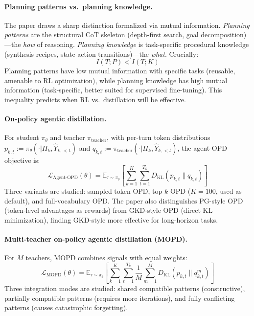 \documentclass[11pt,a4paper]{article}
\begin{document}
\paragraph{Planning patterns vs.\ planning knowledge.}
The paper draws a sharp distinction formalized via mutual information. \emph{Planning patterns} are the structural CoT skeleton (depth-first search, goal decomposition)---the \emph{how} of reasoning. \emph{Planning knowledge} is task-specific procedural knowledge (synthesis recipes, state-action transitions)---the \emph{what}. Crucially:
\begin{equation}
    I(T; P) < I(T; K)
\end{equation}
Planning patterns have low mutual information with specific tasks (reusable, amenable to RL optimization), while planning knowledge has high mutual information (task-specific, better suited for supervised fine-tuning). This inequality predicts when RL vs.\ distillation will be effective.

\paragraph{On-policy agentic distillation.}
For student $\pi_\theta$ and teacher $\pi_{\text{teacher}}$, with per-turn token distributions $p_{k,t} := \pi_\theta(\cdot|H_k, \hat{Y}_{k,<t})$ and $q_{k,t} := \pi_{\text{teacher}}(\cdot|H_k, \hat{Y}_{k,<t})$, the agent-OPD objective is:
\begin{equation}
    \mathcal{L}_{\text{Agent-OPD}}(\theta) = \mathbb{E}_{\tau \sim \pi_\theta}\left[\sum_{k=1}^{K}\sum_{t=1}^{T_k} D_{\text{KL}}(p_{k,t} \| q_{k,t})\right]
\end{equation}
Three variants are studied: sampled-token OPD, top-$k$ OPD ($K=100$, used as default), and full-vocabulary OPD. The paper also distinguishes PG-style OPD (token-level advantages as rewards) from GKD-style OPD (direct KL minimization), finding GKD-style more effective for long-horizon tasks.

\paragraph{Multi-teacher on-policy agentic distillation (MOPD).}
For $M$ teachers, MOPD combines signals with equal weights:
\begin{equation}
    \mathcal{L}_{\text{MOPD}}(\theta) = \mathbb{E}_{\tau \sim \pi_\theta}\left[\sum_{k=1}^{K}\sum_{t=1}^{T_k} \frac{1}{M}\sum_{m=1}^{M} D_{\text{KL}}(p_{k,t} \| q_{k,t}^m)\right]
\end{equation}
Three integration modes are studied: shared compatible patterns (constructive), partially compatible patterns (requires more iterations), and fully conflicting patterns (causes catastrophic forgetting).
\end{document}
